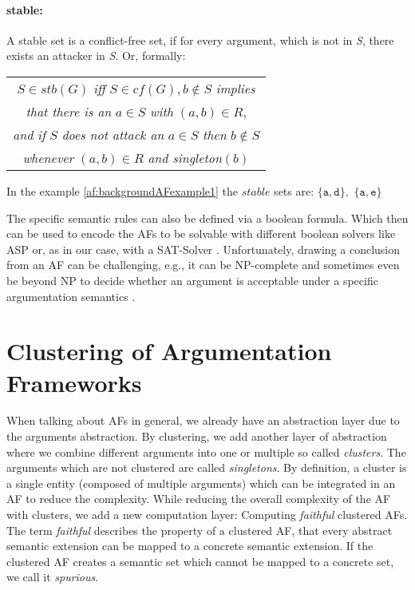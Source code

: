 \paragraph{stable:} A stable set is a conflict-free set, if for every argument, which is not in \textit{S}, there exists an attacker in \textit{S}. Or, formally:

\begin{center}
    \begin{tabular}{c}
        $S \in stb(G)$ \textit{iff} $S \in cf(G),  b \not\in S$ \textit{implies}\\

        \textit{that there is an} $a \in S$ \textit{with} $(a, b) \in R$,\\

        \textit{and if} $S$ \textit{does not attack an} $a \in S$ \textit{then} $b \not\in S$\\

        \textit{whenever} $(a, b) \in R$ \textit{and singleton}$(b)$
    \end{tabular}
\end{center}


 In the example \ref{af:backgroundAFexample1} the $stable$ sets are:
$\mathtt{\{a, d\}},$
$\mathtt{\{a, e\}}$

\vspace{0.5cm}
\noindent
The specific semantic rules can also be defined via a boolean formula. Which then can be used to encode the AFs to be solvable with different boolean solvers like \ac{ASP} \cite{DBLP:journals/corr/abs-1301-1388} or, as in our case, with a \ac{SAT-Solver} \cite{DBLP:journals/amai/AmgoudD13}. Unfortunately, drawing a conclusion from an AF can be challenging, e.g., it can be NP-complete and sometimes even be beyond NP to decide whether an argument is acceptable under a specific argumentation semantics \cite{DBLP:journals/ai/DvorakGRW23}.



\section{Clustering of Argumentation Frameworks}

When talking about AFs in general, we already have an abstraction layer due to the arguments abstraction. By clustering, we add another layer of abstraction where we combine different arguments into one or multiple so called \textit{clusters}. The arguments which are not clustered are called \textit{singletons}.
By definition, a cluster is a single entity (composed of multiple arguments) which can be integrated in an AF to reduce the complexity. While reducing the overall complexity of the AF with clusters, we add a new computation layer: Computing \textit{faithful} clustered AFs. The term \textit{faithful} describes the property of a clustered AF, that every abstract semantic extension can be mapped to a concrete semantic extension. If the clustered AF creates a semantic set which cannot be mapped to a concrete set, we call it \textit{spurious}.

